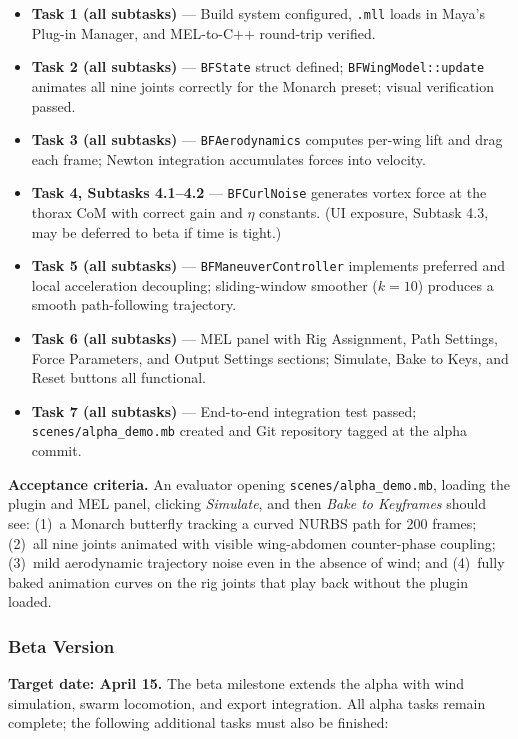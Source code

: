 \documentclass[12pt]{article}
\begin{document}
\begin{itemize}
  \item \textbf{Task 1 (all subtasks)} --- Build system configured, \texttt{.mll}
    loads in Maya's Plug-in Manager, and MEL-to-C++ round-trip verified.
  \item \textbf{Task 2 (all subtasks)} --- \texttt{BFState} struct defined;
    \texttt{BFWingModel::update} animates all nine joints correctly for the Monarch
    preset; visual verification passed.
  \item \textbf{Task 3 (all subtasks)} --- \texttt{BFAerodynamics} computes per-wing
    lift and drag each frame; Newton integration accumulates forces into velocity.
  \item \textbf{Task 4, Subtasks 4.1--4.2} --- \texttt{BFCurlNoise} generates
    vortex force at the thorax CoM with correct gain and $\eta$ constants. (UI
    exposure, Subtask 4.3, may be deferred to beta if time is tight.)
  \item \textbf{Task 5 (all subtasks)} --- \texttt{BFManeuverController} implements
    preferred and local acceleration decoupling; sliding-window smoother ($k=10$)
    produces a smooth path-following trajectory.
  \item \textbf{Task 6 (all subtasks)} --- MEL panel with Rig Assignment, Path
    Settings, Force Parameters, and Output Settings sections; Simulate, Bake to Keys,
    and Reset buttons all functional.
  \item \textbf{Task 7 (all subtasks)} --- End-to-end integration test passed;
    \texttt{scenes/alpha\_demo.mb} created and Git repository tagged at the alpha
    commit.
\end{itemize}

\noindent\textbf{Acceptance criteria.}
An evaluator opening \texttt{scenes/alpha\_demo.mb}, loading the plugin and MEL
panel, clicking \textit{Simulate}, and then \textit{Bake to Keyframes} should
see: (1)~a Monarch butterfly tracking a curved NURBS path for 200 frames;
(2)~all nine joints animated with visible wing-abdomen counter-phase coupling;
(3)~mild aerodynamic trajectory noise even in the absence of wind; and
(4)~fully baked animation curves on the rig joints that play back without the
plugin loaded.

\subsubsection{Beta Version}

\textbf{Target date: April 15.} \quad
The beta milestone extends the alpha with wind simulation, swarm locomotion,
and export integration. All alpha tasks remain complete; the following
additional tasks must also be finished:
\end{document}
